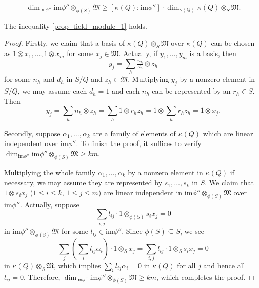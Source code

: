 \documentclass[10pt,a4paper]{amsart}
\begin{document}
\begin{equation}\label{prop_field_module_1}
\dim_{\mathrm{im} \phi''} \mathrm{im} \phi'' \otimes_{\phi (S)} \mathfrak{M} \geq [\kappa (Q): \mathrm{im} \phi''] \cdot \dim_{\kappa (Q)} \kappa (Q) \otimes_{S} \mathfrak{M}.
\end{equation}

\begin{lemma}\label{lem_dimension_inequality}
The inequality \eqref{prop_field_module_1} holds.
\end{lemma}

\begin{proof}
Firstly, we claim that a basis of $\kappa (Q) \otimes_{S} \mathfrak{M}$ over $\kappa (Q)$ can be chosen as $1 \otimes x_{1}, \dots, 1 \otimes x_{m}$ for some $x_{j} \in \mathfrak{M}$. Actually, if $y_{1}, \dots, y_{m}$ is a basis, then
\[
y_{j} = \sum_{h} \tfrac{n_{h}}{d_{h}} \otimes z_{h}
\]
for some $n_{h}$ and $d_{h}$ in $S/Q$ and $z_{h} \in \mathfrak{M}$. Multiplying $y_{j}$ by a nonzero element in $S/Q$, we may assume each $d_{h} =1$ and each $n_{h}$ can be represented by an $r_{h} \in S$. Then
\[
y_{j} = \sum_{h} n_{h} \otimes z_{h} = \sum_{h} 1 \otimes r_{h} z_{h} = 1 \otimes \sum_{h} r_{h} z_{h} = 1 \otimes x_{j}.
\]

Secondly, suppose $\alpha_{1}, \dots, \alpha_{k}$ are a family of elements of $\kappa (Q)$ which are linear independent over $\mathrm{im} \phi''$. To finish the proof, it suffices to verify $\dim_{\mathrm{im} \phi''} \mathrm{im} \phi'' \otimes_{\phi (S)} \mathfrak{M} \ge km$.

Multiplying the whole family $\alpha_{1}, \dots, \alpha_{k}$ by a nonzero element in $\kappa (Q)$ if necessary, we may assume they are represented by $s_{1}, \dots, s_{k}$ in $S$. We claim that $1 \otimes s_{i} x_{j}$ ($1 \leq i \leq k$, $1 \leq j \leq m$) are linear independent in $\mathrm{im} \phi'' \otimes_{\phi (S)} \mathfrak{M}$ over $\mathrm{im} \phi''$. Actually, suppose
\[
\sum_{i,j} l_{ij} \cdot 1 \otimes_{\phi (S)} s_{i} x_{j} =0
\]
in $\mathrm{im} \phi'' \otimes_{\phi (S)} \mathfrak{M}$ for some $l_{ij} \in \mathrm{im} \phi''$. Since $\phi (S) \subseteq S$, we see
\[
\sum_{j} \left( \sum_{i} l_{ij} \alpha_{i} \right) \cdot 1 \otimes_{S} x_{j} = \sum_{i,j} l_{ij} \cdot 1 \otimes_{S} s_{i} x_{j} = 0
\]
in $\kappa (Q) \otimes_{S} \mathfrak{M}$, which implies $\sum_{i} l_{ij} \alpha_{i} =0$ in $\kappa (Q)$ for all $j$ and hence all $l_{ij} =0$. Therefore, $\dim_{\mathrm{im} \phi''} \mathrm{im} \phi'' \otimes_{\phi (S)} \mathfrak{M} \ge km$, which completes the proof.
\end{proof}
\end{document}
